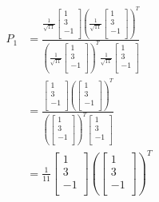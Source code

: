 \documentclass[12pt,letterpaper]{article}
\begin{document}
\begin{enumerate}
\begin{enumerate}
          \begin{align*}
            P_1 &= \frac{\frac{1}{\sqrt{11}}\begin{bmatrix}1 \\ 3 \\ -1 \\\end{bmatrix} \left(\frac{1}{\sqrt{11}}\begin{bmatrix}1 \\ 3 \\ -1 \\\end{bmatrix}\right)^T}{\left(\frac{1}{\sqrt{11}}\begin{bmatrix}1 \\ 3 \\ -1 \\\end{bmatrix}\right)^T \frac{1}{\sqrt{11}}\begin{bmatrix}1 \\ 3 \\ -1 \\\end{bmatrix}} \\
            &= \frac{\begin{bmatrix}1 \\ 3 \\ -1 \\\end{bmatrix} \left(\begin{bmatrix}1 \\ 3 \\ -1 \\\end{bmatrix}\right)^T}{\left(\begin{bmatrix}1 \\ 3 \\ -1 \\\end{bmatrix}\right)^T \begin{bmatrix}1 \\ 3 \\ -1 \\\end{bmatrix}} \\
            &= \frac{1}{11}\begin{bmatrix}1 \\ 3 \\ -1 \\\end{bmatrix} \left(\begin{bmatrix}1 \\ 3 \\ -1 \\\end{bmatrix}\right)^T \\

\end{align*}
\end{enumerate}
\end{enumerate}
\end{document}
